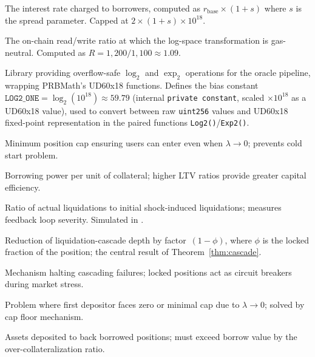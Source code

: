 \documentclass[10pt,a4paper,twocolumn]{article}
\begin{document}
\begin{description}[style=nextline, leftmargin=2.5em, labelindent=0em, font=\normalfont\bfseries]
\item[Borrow Rate] The interest rate charged to borrowers, computed as $r_{\text{base}} \times (1 + s)$ where $s$ is the spread parameter. Capped at $2 \times (1 + s) \times 10^{18}$.

\item[Break-Even Ratio ($R$)] The on-chain read/write ratio at which the log-space transformation is gas-neutral. Computed as $R = 1{,}200 / 1{,}100 \approx 1.09$.


\item[Calculator] Library providing overflow-safe $\log_2$ and $\exp_2$ operations for the oracle pipeline, wrapping PRBMath's UD60x18 functions. Defines the bias constant $\texttt{LOG2\_ONE} = \log_2(10^{18}) \approx 59.79$ (internal \texttt{private constant}, scaled $\times 10^{18}$ as a UD60x18 value), used to convert between raw \texttt{uint256} values and UD60x18 fixed-point representation in the paired functions \texttt{Log2()}/\texttt{Exp2()}.

\item[Cap Floor] Minimum position cap ensuring users can enter even when $\lambda \to 0$; prevents cold start problem.

\item[Capital Efficiency] Borrowing power per unit of collateral; higher LTV ratios provide greater capital efficiency.

\item[Cascade Amplification] Ratio of actual liquidations to initial shock-induced liquidations; measures feedback loop severity. Simulated in \cite{sim}.

\item[Cascade Attenuation] Reduction of liquidation-cascade depth by factor~$(1{-}\phi)$, where $\phi$ is the locked fraction of the position; the central result of Theorem~\ref{thm:cascade}.

\item[Circuit Breaker] Mechanism halting cascading failures; locked positions act as circuit breakers during market stress.

\item[Cold Start] Problem where first depositor faces zero or minimal cap due to $\lambda \to 0$; solved by cap floor mechanism.

\item[Collateral] Assets deposited to back borrowed positions; must exceed borrow value by the over-collateralization ratio.


\end{description}
\end{document}

